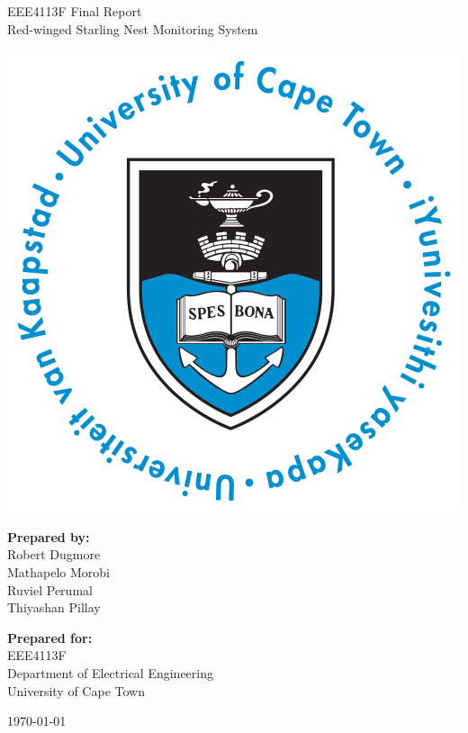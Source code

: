 \thispagestyle{empty}
\begin{center}
    
\Huge

\vspace{5cm}

EEE4113F Final Report \\
Red-winged Starling Nest Monitoring System

\vspace{2.5cm}

\includegraphics[width=0.4\linewidth]{FrontMatter/UCT_logo.png}

\vfill

\large
\textbf{Prepared by:}\\
Robert Dugmore\\
Mathapelo Morobi\\
Ruviel Perumal\\
Thiyashan Pillay

\vspace{1cm}

\textbf{Prepared for:}\\
EEE4113F\\
Department of Electrical Engineering\\
University of Cape Town

\vspace{2cm}

\today


\end{center}
